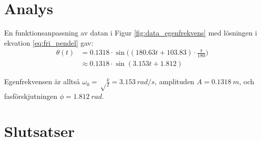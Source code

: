 \documentclass[12pt, a4paper]{article}
\begin{document}
\clearpage
\section{Analys}

En funktionsanpassning av datan i Figur \ref{fig:data_egenfrekvens} med lösningen i ekvation \ref{eq:fri_pendel} gav:
\begin{equation}
    \begin{split}        
        \theta(t)&=0.1318\cdot\sin\bigl((180.63t+103.83)\cdot\frac{\pi}{180}\bigr)\\
        &\approx0.1318\cdot\sin(3.153t+1.812)
    \end{split}
\end{equation}

Egenfrekvensen är alltså $\omega_0=\sqrt\frac{k}{I}=\SI{3.153}{rad/s}$, amplituden $A=\SI{0.1318}{m}$, och fas\-förskjutningen $\phi=\SI{1.812}{rad}$.

\section{Slutsatser}
\end{document}
